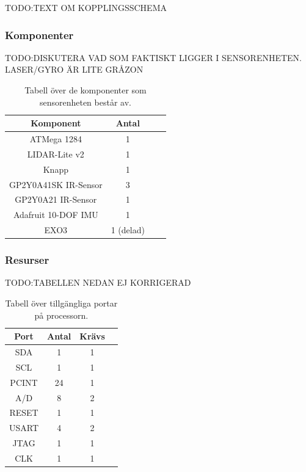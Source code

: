 \documentclass{article}
\begin{document}
TODO:TEXT OM KOPPLINGSSCHEMA

\subsubsection{Komponenter}

TODO:DISKUTERA VAD SOM FAKTISKT LIGGER I SENSORENHETEN. LASER/GYRO ÄR LITE GRÅZON
\begin{table}[H]
  \centering
  \begin{tabular}{ | c | c | c | c |}
    \hline
    \textbf{Komponent} & \textbf{Antal} \\
    \hline
    ATMega 1284 & 1 \\
    \hline
    LIDAR-Lite v2 & 1 \\
    \hline
    Knapp & 1 \\
    \hline
    GP2Y0A41SK IR-Sensor & 3 \\
    \hline
    GP2Y0A21 IR-Sensor & 1 \\
    \hline
    Adafruit 10-DOF IMU & 1 \\
    \hline
    EXO3 & 1 (delad) \\
    \hline
  \end{tabular}
  \caption{ Tabell över de komponenter som sensorenheten består av. }
\end{table}

\subsubsection{Resurser}

TODO:TABELLEN NEDAN EJ KORRIGERAD
\begin{table}[H]
  \centering
  \begin{tabular}{ | c | c | c | c |}
    \hline
    \textbf{Port} & \textbf{Antal} & \textbf{Krävs} \\
    \hline
    SDA & 1 & 1 \\
    \hline
    SCL & 1 & 1 \\
    \hline
    PCINT & 24 & 1 \\
    \hline
    A/D & 8 & 2 \\
    \hline
    RESET & 1 & 1 \\
    \hline
    USART & 4 & 2 \\
    \hline
    JTAG & 1 & 1 \\
    \hline
    CLK & 1 & 1 \\
    \hline
  \end{tabular}
  \caption{Tabell över tillgängliga portar på processorn.}
\end{table}
\end{document}
